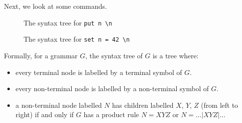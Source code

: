 \documentclass[a4paper, openany]{memoir}
\begin{document}
\noindent Next, we look at some commands.
\begin{figure}[H]
    \centering
    \caption{The syntax tree for \texttt{put n \textbackslash n}}
\end{figure}

\begin{figure}[H]
    \centering
    \caption{The syntax tree for \texttt{set n = 42 \textbackslash n}}
\end{figure}

Formally, for a grammar $G$, the syntax tree of $G$ is a tree where:
\begin{itemize}
    \item every terminal node is labelled by a terminal symbol of $G$.
    \item every non-terminal node is labelled by a non-terminal symbol of $G$.
    \item a non-terminal node labelled $N$ has children labelled $X$, $Y$, $Z$ (from left to right) if and only if $G$ has a product rule $N = XYZ$ or $N = \dots | XYZ | \dots$
\end{itemize}
\end{document}
